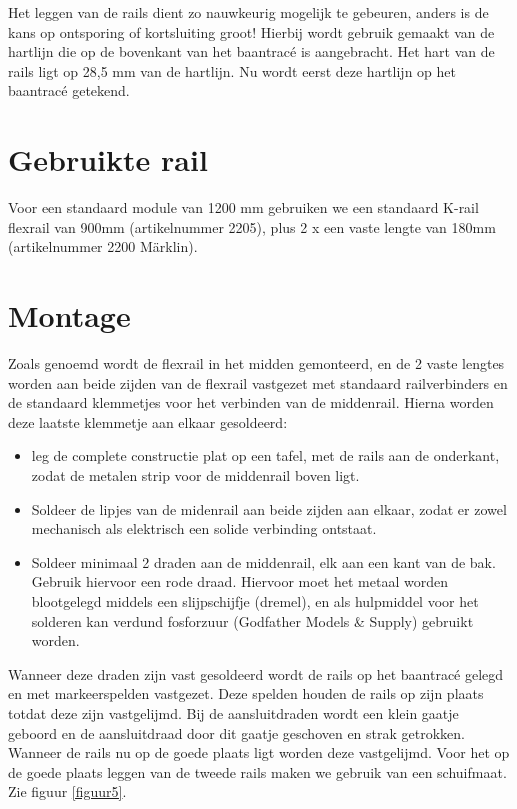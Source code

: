 \documentclass[12pt,a4paper]{report}
\newcommand*{\marklin}{M\"{a}rklin}
\newcommand*{\trace}{trac\'{e} }
\begin{document}
Het leggen van de rails dient zo nauwkeurig mogelijk te gebeuren, anders is de kans op ontsporing of kortsluiting groot! Hierbij wordt gebruik gemaakt van de hartlijn die op de bovenkant van het baan\trace is aangebracht.
Het hart van de rails ligt op 28,5 mm van de hartlijn. Nu wordt eerst deze hartlijn op het baan\trace getekend.

\section{Gebruikte rail}
Voor een standaard module van 1200 mm gebruiken we een standaard K-rail flexrail van 900mm (artikelnummer 2205), plus 2 x een vaste lengte van 180mm (artikelnummer 2200 \marklin ).

\section{Montage}
Zoals genoemd wordt de flexrail in het midden gemonteerd, en de 2 vaste lengtes worden aan beide zijden van de flexrail vastgezet met standaard railverbinders en de standaard klemmetjes voor het verbinden van de middenrail. Hierna worden deze laatste klemmetje aan elkaar gesoldeerd:

\begin{itemize}
\item leg de complete constructie plat op een tafel, met de rails aan de onderkant, zodat de metalen strip voor de middenrail boven ligt.
\item Soldeer de lipjes van de midenrail aan beide zijden aan elkaar, zodat er zowel mechanisch als elektrisch een solide verbinding ontstaat.
\item Soldeer minimaal 2 draden aan de middenrail, elk aan een kant van de bak. Gebruik hiervoor een rode draad. Hiervoor moet het metaal worden blootgelegd middels een slijpschijfje (dremel), en als hulpmiddel voor het solderen kan verdund fosforzuur (Godfather Models \& Supply) gebruikt worden.
\end{itemize}

Wanneer deze draden zijn vast gesoldeerd wordt de rails op het baan\trace gelegd en met markeerspelden vastgezet. Deze spelden houden de rails op zijn plaats totdat deze zijn vastgelijmd. Bij de aansluitdraden wordt een klein gaatje geboord en de aansluitdraad door dit gaatje geschoven en strak getrokken. Wanneer de rails nu op de goede plaats ligt worden deze vastgelijmd. Voor het op de goede plaats leggen van de tweede rails maken we gebruik van een schuifmaat. Zie figuur \ref{figuur5}.
\end{document}

